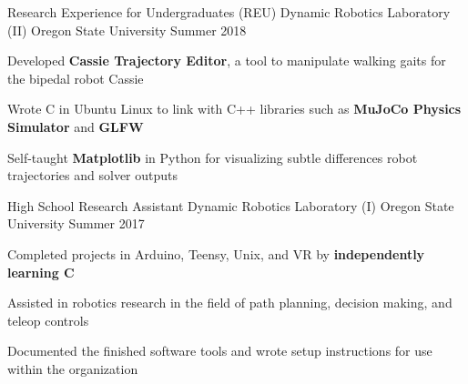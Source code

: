 \begin{cventries}
  \cventry
    {Research Experience for Undergraduates (REU)} %
    {Dynamic Robotics Laboratory (II)} %
    {Oregon State University} %
    {Summer 2018} %
    {
      \begin{cvitems} %
        \item {Developed \textbf{Cassie Trajectory Editor}, a tool to manipulate walking gaits for the bipedal robot Cassie}
        \item {Wrote C in Ubuntu Linux to link with C++ libraries such as \textbf{MuJoCo Physics Simulator} and \textbf{GLFW}}
        \item {Self-taught \textbf{Matplotlib} in Python for visualizing subtle differences robot trajectories and solver outputs}
      \end{cvitems}
    }
  



  \cventry
    {High School Research Assistant} %
    {Dynamic Robotics Laboratory (I)} %
    {Oregon State University} %
    {Summer 2017} %
    {
      \begin{cvitems} %
        \item {Completed projects in Arduino, Teensy, Unix, and VR by \textbf{independently learning C} }
        \item {Assisted in robotics research in the field of path planning, decision making, and teleop controls}
        \item {Documented the finished software tools and wrote setup instructions for use within the organization}
      \end{cvitems}
    }





\end{cventries}

